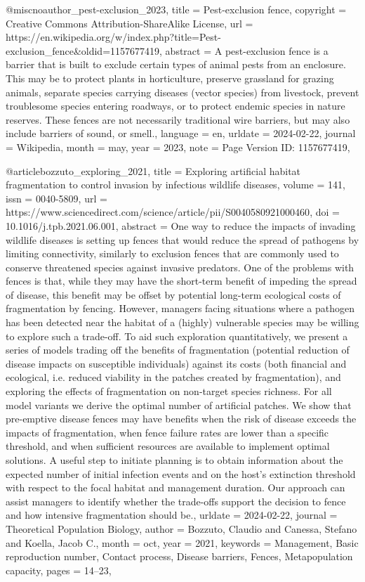 {{{{@misc{noauthor_pest-exclusion_2023,
	title = {Pest-exclusion fence},
	copyright = {Creative Commons Attribution-ShareAlike License},
	url = {https://en.wikipedia.org/w/index.php?title=Pest-exclusion_fence&oldid=1157677419},
	abstract = {A pest-exclusion fence is a barrier that is built to exclude certain types of animal pests from an enclosure. This may be to protect plants in horticulture, preserve grassland for grazing animals, separate species carrying diseases (vector species) from livestock, prevent troublesome species entering roadways, or to protect endemic species in nature reserves. These fences are not necessarily traditional wire barriers, but may also include barriers of sound, or smell.},
	language = {en},
	urldate = {2024-02-22},
	journal = {Wikipedia},
	month = may,
	year = {2023},
	note = {Page Version ID: 1157677419},
}

@article{bozzuto_exploring_2021,
	title = {Exploring artificial habitat fragmentation to control invasion by infectious wildlife diseases},
	volume = {141},
	issn = {0040-5809},
	url = {https://www.sciencedirect.com/science/article/pii/S0040580921000460},
	doi = {10.1016/j.tpb.2021.06.001},
	abstract = {One way to reduce the impacts of invading wildlife diseases is setting up fences that would reduce the spread of pathogens by limiting connectivity, similarly to exclusion fences that are commonly used to conserve threatened species against invasive predators. One of the problems with fences is that, while they may have the short-term benefit of impeding the spread of disease, this benefit may be offset by potential long-term ecological costs of fragmentation by fencing. However, managers facing situations where a pathogen has been detected near the habitat of a (highly) vulnerable species may be willing to explore such a trade-off. To aid such exploration quantitatively, we present a series of models trading off the benefits of fragmentation (potential reduction of disease impacts on susceptible individuals) against its costs (both financial and ecological, i.e. reduced viability in the patches created by fragmentation), and exploring the effects of fragmentation on non-target species richness. For all model variants we derive the optimal number of artificial patches. We show that pre-emptive disease fences may have benefits when the risk of disease exceeds the impacts of fragmentation, when fence failure rates are lower than a specific threshold, and when sufficient resources are available to implement optimal solutions. A useful step to initiate planning is to obtain information about the expected number of initial infection events and on the host’s extinction threshold with respect to the focal habitat and management duration. Our approach can assist managers to identify whether the trade-offs support the decision to fence and how intensive fragmentation should be.},
	urldate = {2024-02-22},
	journal = {Theoretical Population Biology},
	author = {Bozzuto, Claudio and Canessa, Stefano and Koella, Jacob C.},
	month = oct,
	year = {2021},
	keywords = {Management, Basic reproduction number, Contact process, Disease barriers, Fences, Metapopulation capacity},
	pages = {14--23},
}

}}}}
